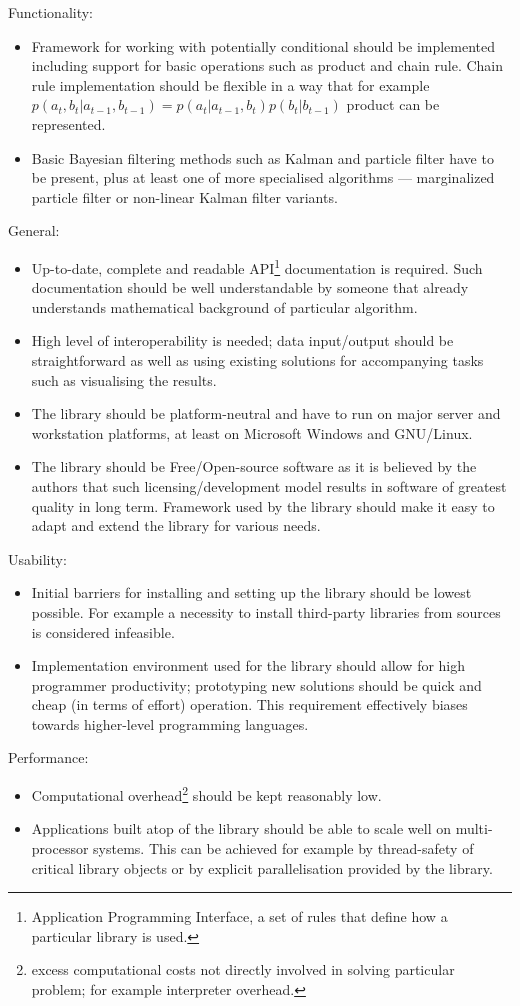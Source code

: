 \noindent Functionality:
\begin{itemize}
	\item Framework for working with potentially conditional {\pdfs} should be implemented
		including support for basic operations such as product and chain rule. Chain rule
		implementation should be flexible in a way that for example
		\(p(a_t,b_t|a_{t-1},b_{t-1}) = p(a_t|a_{t-1},b_t)p(b_t|b_{t-1})\) product can be
		represented.
	\item Basic Bayesian filtering methods such as Kalman and particle filter have to be present,
		plus at least one of more specialised algorithms --- marginalized particle filter or
		non-linear Kalman filter variants.
\end{itemize}
General:
\begin{itemize}
	\item Up-to-date, complete and readable API\footnote{Application Programming Interface, a set of
		rules that define how a particular library is used.} documentation is required. Such
		documentation should be well understandable by someone that already understands mathematical
		background of particular algorithm.
	\item High level of interoperability is needed; data input/output should be straightforward as
		well as using existing solutions for accompanying tasks such as visualising the results.
	\item The library should be platform-neutral and have to run on major server and workstation
		platforms, at least on Microsoft Windows and GNU/Linux.
	\item The library should be Free/Open-source software as it is believed by the authors that such
		licensing/development model results in software of greatest quality in long term. Framework
		used by the library should make it easy to adapt and extend the library for various needs.
\end{itemize}
Usability:
\begin{itemize}
	\item Initial barriers for installing and setting up the library should be lowest possible.
		For example a necessity to install third-party libraries from sources is considered
		infeasible.
	\item Implementation environment used for the library should allow for high programmer
		productivity; prototyping new solutions should be quick and cheap (in terms of effort)
		operation. This requirement effectively biases towards higher-level programming
		languages.
\end{itemize}
Performance:
\begin{itemize}
	\item Computational overhead\footnote{excess computational costs not directly involved
		in solving particular problem; for example interpreter overhead.} should be kept reasonably
		low.
	\item Applications built atop of the library should be able to scale well on multi-processor
		systems. This can be achieved for example by thread-safety of critical library objects
		or by explicit parallelisation provided by the library.
\end{itemize}

